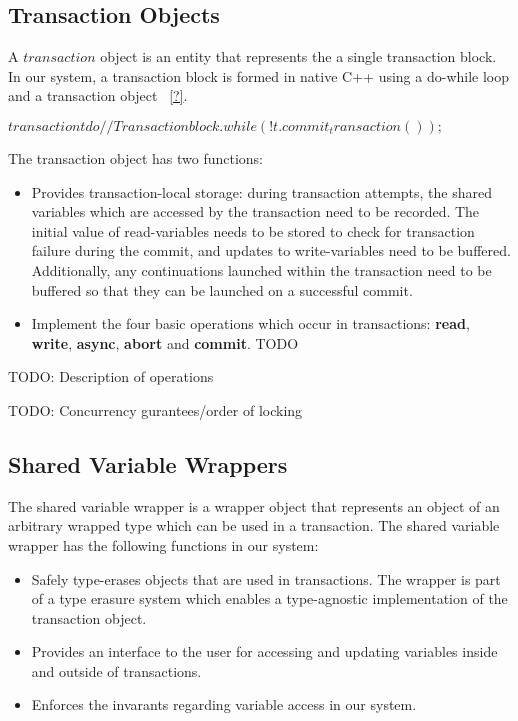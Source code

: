 \documentclass[conference]{IEEEtran}
\begin{document}
\subsection{Transaction Objects}

A $transaction$ object is an entity that represents the a single transaction
block. In our system, a transaction block is formed in native C++ using a
do-while loop and a transaction object ~\ref{?}.

$
transaction t
do {
    // Transaction block.
} while (!t.commit_transaction());
$

The transaction object has two functions:

\begin{itemize}
\item Provides transaction-local storage: during transaction attempts, the
shared variables which are accessed by the transaction need to be recorded. The
initial value of read-variables needs to be stored to check for transaction
failure during the commit, and updates to write-variables need to be buffered.
Additionally, any continuations launched within the transaction need to be
buffered so that they can be launched on a successful commit.
\item Implement the four basic operations which occur in transactions:
\textbf{read}, \textbf{write}, \textbf{async}, \textbf{abort} and
\textbf{commit}. TODO
\end{itemize}

TODO: Description of operations

TODO: Concurrency gurantees/order of locking

\subsection{Shared Variable Wrappers}

The shared variable wrapper is a wrapper object that represents an object of an
arbitrary wrapped type which can be used in a transaction. The shared variable
wrapper has the following functions in our system:

\begin{itemize}
\item Safely type-erases objects that are used in transactions. The wrapper is
part of a type erasure system which enables a type-agnostic implementation of
the transaction object.
\item Provides an interface to the user for accessing and updating variables
inside and outside of transactions.
\item Enforces the invarants regarding variable access in our system.
\end{itemize}
\end{document}
